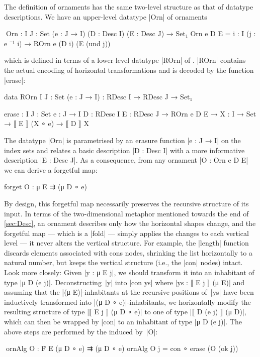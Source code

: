The definition of ornaments has the same two-level structure as that of datatype descriptions.
We have an upper-level datatype |Orn| of ornaments
\begin{code}
^^^Orn : {I J : Set} (e : J → I) (D : Desc I) (E : Desc J) → Set₁
Orn e D E = {i : I} (j : e ⁻¹ i) → ROrn e (D i) (E (und j))
\end{code}
which is defined in terms of a lower-level datatype |ROrn| of .
|ROrn| contains the actual encoding of horizontal transformations and is decoded by the function |erase|:
\begin{code}
data ROrn {I J : Set} (e : J → I) : RDesc I → RDesc J → Set₁
           
erase :  {I J : Set} {e : J → I} {D : RDesc I} {E : RDesc J} →
         ROrn e D E → {X : I → Set} → ⟦ E ⟧ (X ∘ e) → ⟦ D ⟧ X
\end{code}
The datatype |Orn| is parametrised by an erasure function |e : J → I| on the index sets and relates a basic description |D : Desc I| with a more informative description |E : Desc J|.
As a consequence, from any ornament |O : Orn e D E| we can derive a forgetful map:
\begin{spec}
forget O : μ E ⇉ (μ D ∘ e)
\end{spec}
By design, this forgetful map necessarily preserves the recursive structure of its input.
In terms of the two-dimensional metaphor mentioned towards the end of \autoref{sec:Desc}, an ornament describes only how the horizontal shapes change, and the forgetful map --- which is a |fold| --- simply applies the changes to each vertical level --- it never alters the vertical structure.
For example, the |length| function discards elements associated with cons nodes, shrinking the list horizontally to a natural number, but keeps the vertical structure (i.e., the |con| nodes) intact.
Look more closely:
Given |y : μ E j|, we should transform it into an inhabitant of type |μ D (e j)|.
Deconstructing~|y| into |con ys| where |ys : ⟦ E j ⟧ (μ E)| and assuming that the |(μ E)|-inhabitants at the recursive positions of~|ys| have been inductively transformed into |(μ D ∘ e)|-inhabitants, we horizontally modify the resulting structure of type |⟦ E j ⟧ (μ D ∘ e)| to one of type |⟦ D (e j) ⟧ (μ D)|, which can then be wrapped by |con| to an inhabitant of type |μ D (e j)|.
The above steps are performed by the  induced by~|O|:
\begin{code}
^^^ornAlg O : Ḟ E (μ D ∘ e) ⇉ (μ D ∘ e)
ornAlg O {j} = con ∘ erase (O (ok j))
\end{code}
